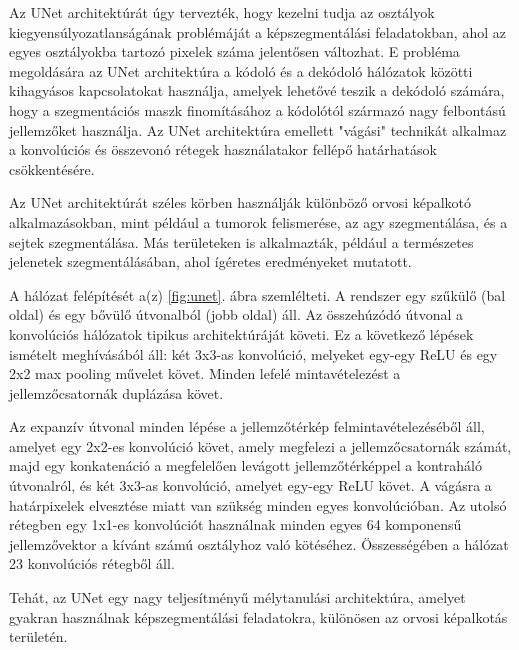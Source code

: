 \documentclass[12pt,a4]{article}
\begin{document}
                Az UNet architektúrát úgy tervezték, hogy kezelni tudja az osztályok kiegyensúlyozatlanságának problémáját a képszegmentálási feladatokban, ahol az egyes osztályokba tartozó pixelek száma jelentősen változhat. E probléma megoldására az UNet architektúra a kódoló és a dekódoló hálózatok közötti kihagyásos kapcsolatokat használja, amelyek lehetővé teszik a dekódoló számára, hogy a szegmentációs maszk finomításához a kódolótól származó nagy felbontású jellemzőket használja. Az UNet architektúra emellett "vágási" technikát alkalmaz a konvolúciós és összevonó rétegek használatakor fellépő határhatások csökkentésére.
    
                Az UNet architektúrát széles körben használják különböző orvosi képalkotó alkalmazásokban, mint például a tumorok felismerése, az agy szegmentálása, és a sejtek szegmentálása. Más területeken is  alkalmazták, például a természetes jelenetek szegmentálásában, ahol ígéretes eredményeket mutatott.
    
                A hálózat felépítését a(z) \ref{fig:unet}. ábra szemlélteti. A rendszer egy szűkülő (bal oldal) és egy bővülő útvonalból (jobb oldal) áll. Az összehúzódó útvonal a konvolúciós hálózatok tipikus architektúráját követi. Ez a következő lépések ismételt meghívásából áll: 
                két 3x3-as konvolúció, melyeket egy-egy ReLU és egy 2x2 max pooling művelet követ. Minden lefelé mintavételezést a jellemzőcsatornák duplázása követ. 
    
                Az expanzív útvonal minden lépése a jellemzőtérkép felmintavételezéséből áll, amelyet egy 2x2-es konvolúció követ, amely megfelezi a jellemzőcsatornák számát, majd egy konkatenáció a megfelelően levágott jellemzőtérképpel a kontraháló útvonalról, és két 3x3-as konvolúció, amelyet egy-egy ReLU követ. A vágásra a határpixelek elvesztése miatt van szükség minden egyes konvolúcióban. Az utolsó rétegben egy 1x1-es konvolúciót használnak minden egyes 64 komponensű jellemzővektor a kívánt számú osztályhoz való kötéséhez. Összességében a hálózat 23 konvolúciós rétegből áll.
    
                Tehát, az UNet egy nagy teljesítményű mélytanulási architektúra, amelyet gyakran használnak képszegmentálási feladatokra, különösen az orvosi képalkotás területén. 
        
\end{document}
